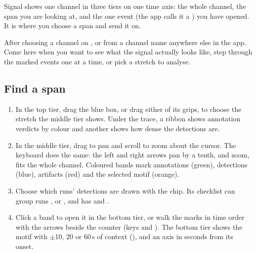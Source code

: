 Signal shows one channel in three tiers on one time axis: the whole channel, the span you
are looking at, and the one event (the app calls it a ) you have opened.
It is where you choose a span and send it on.

After choosing a channel on , or from a channel name anywhere else in
the app. Come here when you want to see what the signal actually looks like, step through
the marked events one at a time, or pick a stretch to analyse.


\subsection{Find a span}\label{sec:explore-find-span}
\begin{enumerate}
  \item In the top tier, drag the blue box, or drag either of its grips, to choose the
    stretch the middle tier shows. Under the trace, a ribbon shows annotation verdicts by
    colour and another shows how dense the detections are.
  \item In the middle tier, drag to pan and scroll to zoom about the cursor. The keyboard
    does the same: the left and right arrows pan by a tenth, \ui{+} and \ui{-} zoom, 
    fits the whole channel. Coloured bands mark annotations (green), detections (blue),
    artifacts (red) and the selected motif (orange).
  \item Choose which runs' detections are drawn with the  chip. Its checklist
    can group runs ,  or , and has  and .
  \item Click a band to open it in the bottom tier, or walk the marks in time order with the
    arrows beside the counter (keys \ui{[} and \ui{]}). The bottom tier shows the motif with
    $\pm$10, 20 or 60\,s of context (), and an axis in seconds from its onset.
\end{enumerate}

